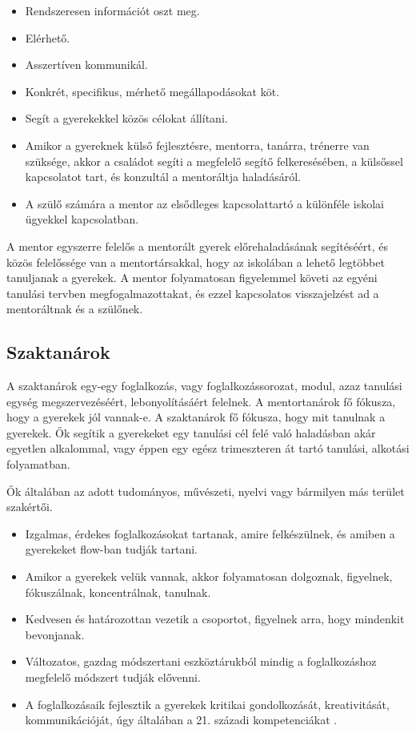 \begin{itemize}
\item
  Rendszeresen információt oszt meg.
\item
  Elérhető.
\item
  Asszertíven kommunikál.
\item
  Konkrét, specifikus, mérhető megállapodásokat köt.
\item
  Segít a gyerekekkel közös célokat állítani.
\item
  Amikor a gyereknek külső fejlesztésre, mentorra, tanárra, trénerre van
  szüksége, akkor a családot segíti a megfelelő segítő felkeresésében, a
  külsőssel kapcsolatot tart, és konzultál a mentoráltja haladásáról.
\item
  A szülő számára a mentor az elsődleges kapcsolattartó a különféle
  iskolai ügyekkel kapcsolatban.
\end{itemize}

A mentor egyszerre felelős a mentorált gyerek előrehaladásának
segítéséért, és közös felelőssége van a mentortársakkal, hogy az
iskolában a lehető legtöbbet tanuljanak a gyerekek. A mentor
folyamatosan figyelemmel követi az egyéni tanulási tervben
megfogalmazottakat, és ezzel kapcsolatos visszajelzést ad a mentoráltnak
és a szülőnek.

\hypertarget{szaktanarok}{%
\subsection{Szaktanárok}\label{szaktanarok}}

A szaktanárok egy-egy foglalkozás, vagy foglalkozássorozat, modul, azaz
tanulási egység megszervezéséért, lebonyolításáért felelnek. A
mentortanárok fő fókusza, hogy a gyerekek jól vannak-e. A szaktanárok fő
fókusza, hogy mit tanulnak a gyerekek. Ők segítik a gyerekeket egy
tanulási cél felé való haladásban akár egyetlen alkalommal, vagy éppen
egy egész trimeszteren át tartó tanulási, alkotási folyamatban.

Ők általában az adott tudományos, művészeti, nyelvi vagy bármilyen más
terület szakértői.

\begin{itemize}
\tightlist
\item
  Izgalmas, érdekes foglalkozásokat tartanak, amire felkészülnek, és amiben a
  gyerekeket flow-ban {\autocite{Csikszentmihalyi1991}} tudják tartani.
\item
  Amikor a gyerekek velük vannak, akkor folyamatosan dolgoznak,
  figyelnek, fókuszálnak, koncentrálnak, tanulnak.
\item
  Kedvesen és határozottan vezetik a csoportot, figyelnek arra, hogy
  mindenkit bevonjanak.
\item
  Változatos, gazdag módszertani eszköztárukból mindig a foglalkozáshoz
  megfelelő módszert tudják elővenni.
\item
  A foglalkozásaik fejlesztik a gyerekek kritikai gondolkozását,
  kreativitását, kommunikációját, úgy általában a 21. századi
  kompetenciákat {\autocite{Trilling2009}}.
\end{itemize}

